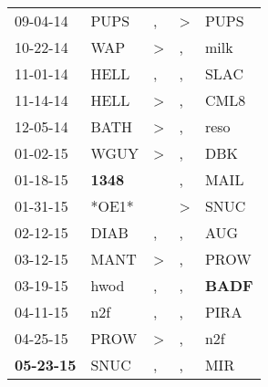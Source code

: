 \begin{supertabular}{p{0.07\textwidth}p{0.06\textwidth}p{0.02\textwidth}p{0.02\textwidth}p{0.06\textwidth}}
          09-04-14\textsuperscript{} &           PUPS\textsuperscript{} &                , &     \textgreater &           PUPS\textsuperscript{} \\
          10-22-14\textsuperscript{} &            WAP\textsuperscript{} &     \textgreater &                , &           milk\textsuperscript{} \\
          11-01-14\textsuperscript{} &           HELL\textsuperscript{} &                , &                , &           SLAC\textsuperscript{} \\
          11-14-14\textsuperscript{} &           HELL\textsuperscript{} &     \textgreater &                , &           CML8\textsuperscript{} \\
          12-05-14\textsuperscript{} &           BATH\textsuperscript{} &     \textgreater &                , &           reso\textsuperscript{} \\
          01-02-15\textsuperscript{} &           WGUY\textsuperscript{} &     \textgreater &                , &            DBK\textsuperscript{} \\
          01-18-15\textsuperscript{} &  \textbf{1348\textsuperscript{}} &                  &                , &           MAIL\textsuperscript{} \\
          01-31-15\textsuperscript{} &                            *OE1* &                  &     \textgreater &           SNUC\textsuperscript{} \\
          02-12-15\textsuperscript{} &           DIAB\textsuperscript{} &                , &                , &            AUG\textsuperscript{} \\
          03-12-15\textsuperscript{} &           MANT\textsuperscript{} &     \textgreater &                , &           PROW\textsuperscript{} \\
          03-19-15\textsuperscript{} &           hwod\textsuperscript{} &                , &                , &  \textbf{BADF\textsuperscript{}} \\
          04-11-15\textsuperscript{} &            n2f\textsuperscript{} &                , &                , &           PIRA\textsuperscript{} \\
          04-25-15\textsuperscript{} &           PROW\textsuperscript{} &     \textgreater &                , &            n2f\textsuperscript{} \\
 \textbf{05-23-15\textsuperscript{}} &           SNUC\textsuperscript{} &                , &                , &            MIR\textsuperscript{} \\

\end{supertabular}
